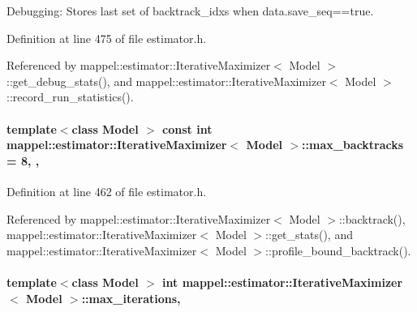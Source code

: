 Debugging\+: Stores last set of backtrack\+\_\+idxs when data.\+save\+\_\+seq==true. 



Definition at line 475 of file estimator.\+h.



Referenced by mappel\+::estimator\+::\+Iterative\+Maximizer$<$ Model $>$\+::get\+\_\+debug\+\_\+stats(), and mappel\+::estimator\+::\+Iterative\+Maximizer$<$ Model $>$\+::record\+\_\+run\+\_\+statistics().

\paragraph[{\texorpdfstring{max\+\_\+backtracks}{max_backtracks}}]{\setlength{\rightskip}{0pt plus 5cm}template$<$class Model $>$ const int {\bf mappel\+::estimator\+::\+Iterative\+Maximizer}$<$ Model $>$\+::max\+\_\+backtracks = 8\hspace{0.3cm}{\ttfamily [static]}, {\ttfamily [protected]}, {\ttfamily [inherited]}}\hypertarget{classmappel_1_1estimator_1_1IterativeMaximizer_ac26f7b7965a26fa21f07732c3b1d727e}{}\label{classmappel_1_1estimator_1_1IterativeMaximizer_ac26f7b7965a26fa21f07732c3b1d727e}


Definition at line 462 of file estimator.\+h.



Referenced by mappel\+::estimator\+::\+Iterative\+Maximizer$<$ Model $>$\+::backtrack(), mappel\+::estimator\+::\+Iterative\+Maximizer$<$ Model $>$\+::get\+\_\+stats(), and mappel\+::estimator\+::\+Iterative\+Maximizer$<$ Model $>$\+::profile\+\_\+bound\+\_\+backtrack().

\paragraph[{\texorpdfstring{max\+\_\+iterations}{max_iterations}}]{\setlength{\rightskip}{0pt plus 5cm}template$<$class Model $>$ int {\bf mappel\+::estimator\+::\+Iterative\+Maximizer}$<$ Model $>$\+::max\+\_\+iterations\hspace{0.3cm}{\ttfamily [protected]}, {\ttfamily [inherited]}}\hypertarget{classmappel_1_1estimator_1_1IterativeMaximizer_abf5fe0b08cfbcc403c3d01511726aa38}{}\label{classmappel_1_1estimator_1_1IterativeMaximizer_abf5fe0b08cfbcc403c3d01511726aa38}


